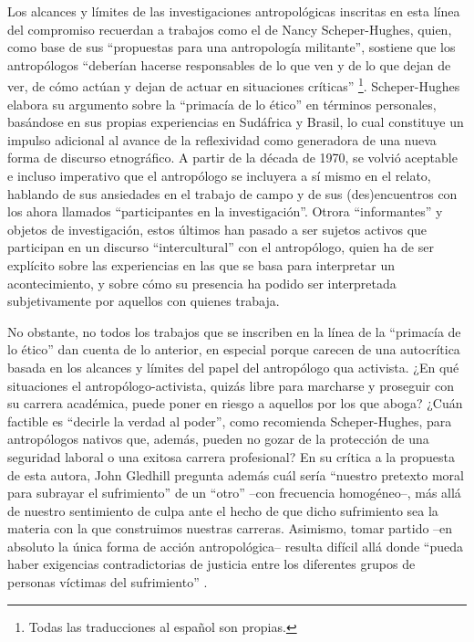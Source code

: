 \documentclass[
  spanish,
  11pt,
  a4paper,
]{scrbook}
\begin{document}
Los alcances y límites de las investigaciones antropológicas inscritas
en esta línea del compromiso recuerdan a trabajos como el de Nancy
Scheper-Hughes, quien, como base de sus ``propuestas para una
antropología militante'', sostiene que los antropólogos ``deberían
hacerse responsables de lo que ven y de lo que dejan de ver, de cómo
actúan y dejan de actuar en situaciones críticas''
\autocite[437]{ScheperHughes1995} \footnote{Todas las traducciones al
  español son propias.}. Scheper-Hughes elabora su argumento sobre la
``primacía de lo ético'' en términos personales, basándose en sus
propias experiencias en Sudáfrica y Brasil, lo cual constituye un
impulso adicional al avance de la reflexividad como generadora de una
nueva forma de discurso etnográfico. A partir de la década de 1970, se
volvió aceptable e incluso imperativo que el antropólogo se incluyera a
sí mismo en el relato, hablando de sus ansiedades en el trabajo de campo
y de sus (des)encuentros con los ahora llamados ``participantes en la
investigación''. Otrora ``informantes'' y objetos de investigación,
estos últimos han pasado a ser sujetos activos que participan en un
discurso ``intercultural'' con el antropólogo, quien ha de ser explícito
sobre las experiencias en las que se basa para interpretar un
acontecimiento, y sobre cómo su presencia ha podido ser interpretada
subjetivamente por aquellos con quienes trabaja.

No obstante, no todos los trabajos que se inscriben en la línea de la
``primacía de lo ético'' dan cuenta de lo anterior, en especial porque
carecen de una autocrítica basada en los alcances y límites del papel
del antropólogo qua activista. ¿En qué situaciones el
antropólogo-activista, quizás libre para marcharse y proseguir con su
carrera académica, puede poner en riesgo a aquellos por los que aboga?
¿Cuán factible es ``decirle la verdad al poder'', como recomienda
Scheper-Hughes, para antropólogos nativos que, además, pueden no gozar
de la protección de una seguridad laboral o una exitosa carrera
profesional? En su crítica a la propuesta de esta autora, John Gledhill
pregunta además cuál sería ``nuestro pretexto moral para subrayar el
sufrimiento'' de un ``otro'' --con frecuencia homogéneo--, más allá de
nuestro sentimiento de culpa ante el hecho de que dicho sufrimiento sea
la materia con la que construimos nuestras carreras. Asimismo, tomar
partido --en absoluto la única forma de acción antropológica-- resulta
difícil allá donde ``pueda haber exigencias contradictorias de justicia
entre los diferentes grupos de personas víctimas del sufrimiento''
\autocite[363]{Gledhill2000}.
\end{document}
